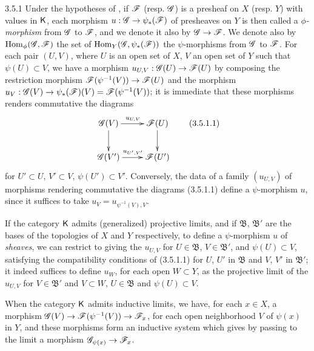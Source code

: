 \begin{env}{3.5.1}
\label{env-0.3.5.1}
Under the hypotheses of , if $\mathscr{F}$ (resp. $\mathscr{G}$) is a presheaf on $X$
(resp. $Y$) with values in $\mathsf{K}$, each morphism $u:\mathscr{G}\to\psi_*(\mathscr{F})$ of presheaves on
$Y$ is then called a \emph{$\phi$-morphism} from $\mathscr{G}$ to $\mathscr{F}$, and we denote it also
by $\mathscr{G}\to\mathscr{F}$. We denote also by ${\mathop{\mathrm{Hom}}\nolimits}_\phi(\mathscr{G},\mathscr{F})$ the set of
${\mathop{\mathrm{Hom}}\nolimits}_Y(\mathscr{G},\psi_*(\mathscr{F}))$ the $\psi$-morphisms from $\mathscr{G}$ to $\mathscr{F}$. For each
pair $(U,V)$, where $U$ is an open set of $X$, $V$ an open set of $Y$ such that
$\psi(U)\subset V$, we have a morphism $u_{U,V}:\mathscr{G}(U)\to\mathscr{F}(U)$ by composing the
restriction morphism $\mathscr{F}(\psi^{-1}(V))\to\mathscr{F}(U)$ and the morphism
$u_V:\mathscr{G}(V)\to\psi_*(\mathscr{F})(V)=\mathscr{F}(\psi^{-1}(V))$; it is immediate that these
morphisms renders commutative the diagrams
\[
  \xymatrix{
    \sh{G}(V)\ar[r]^{u_{U,V}}\ar[d] &
    \sh{F}(U)\ar[d]\\
    \sh{G}(V')\ar[r]^{u_{U',V'}} &
    \sh{F}(U')
  }
  \tag{3.5.1.1}
\]
for $U'\subset U$, $V'\subset V$, $\psi(U')\subset V'$. Conversely, the data of a family
$(u_{U,V})$ of morphisms rendering commutative the diagrams (3.5.1.1) define a
$\psi$-morphism $u$, since it suffices to take $u_V=u_{\psi^{-1}(V),V}$.

If the category $\mathsf{K}$ admits (generalized) projective limits, and if $\mathfrak{B}$,
$\mathfrak{B}'$ are the bases of the topologies of $X$ and $Y$ respectively, to define a
$\psi$-morphism $u$ of \emph{sheaves}, we can restrict to giving the $u_{U,V}$ for
$U\in\mathfrak{B}$, $V\in\mathfrak{B}'$, and $\psi(U)\subset V$, satisfying the compatibility
conditions of (3.5.1.1) for $U$, $U'$ in $\mathfrak{B}$ and $V$, $V'$ in $\mathfrak{B}'$; it
indeed suffices to define $u_W$, for each open $W\subset Y$, as the projective limit of the
$u_{U,V}$ for $V\in\mathfrak{B}'$ and $V\subset W$, $U\in\mathfrak{B}$ and
$\psi(U)\subset V$.

When the category $\mathsf{K}$ admits inductive limits, we have, for each $x\in X$, a morphism
$\mathscr{G}(V)\to\mathscr{F}(\psi^{-1}(V))\to\mathscr{F}_x$, for each open neighborhood $V$ of $\psi(x)$ in
$Y$, and these morphisms form an inductive system which gives by passing to the limit a
morphism $\mathscr{G}_{\psi(x)}\to\mathscr{F}_x$.
\end{env}

